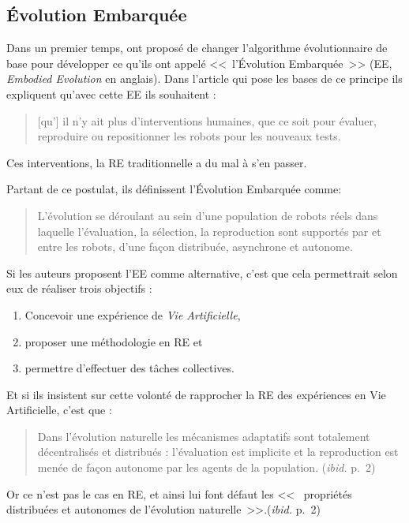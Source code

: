 \subsection{\'Evolution Embarquée}

Dans un premier temps, \cite{watson02embodiedevolutiondistributingevolutionaryalgorithmpopulationrobots} ont proposé de changer l'algorithme évolutionnaire de base pour développer ce qu'ils ont appelé <<~l'\'Evolution Embarquée~>> (EE, \emph{Embodied Evolution} en anglais). Dans l'article qui pose les bases de ce principe ils expliquent qu'avec cette EE ils souhaitent :
\begin{quote}
   [qu'] il n'y ait plus d'interventions humaines, que ce soit pour évaluer, reproduire ou repositionner les robots pour les nouveaux tests.\\
   \citep[p.~1]{watson02embodiedevolutiondistributingevolutionaryalgorithmpopulationrobots}
\end{quote}
Ces interventions, la RE traditionnelle a du mal à s'en passer.

Partant de ce postulat, ils définissent l'\'Evolution Embarquée comme:
\begin{quotation}
   L'évolution se déroulant au sein d'une population de robots réels dans laquelle l'évaluation, la sélection, la reproduction sont supportés par et entre les robots, d'une façon distribuée, asynchrone et autonome.\\
   \citep[p.~2]{watson02embodiedevolutiondistributingevolutionaryalgorithmpopulationrobots}
\end{quotation}

Si les auteurs proposent l'EE comme alternative, c'est que cela permettrait selon eux de réaliser trois objectifs :
\begin{enumerate}
\item Concevoir une expérience de \emph{Vie Artificielle},
\item proposer une méthodologie en RE et
\item permettre d'effectuer des tâches collectives.
\end{enumerate}

Et si ils insistent sur cette volonté de rapprocher la RE des expériences en Vie Artificielle, c'est que :
\begin{quote}
   Dans l'évolution naturelle les mécanismes adaptatifs sont totalement décentralisés et distribués : l'évaluation est implicite et la reproduction est menée de façon autonome par les agents de la population. (\emph{ibid.} p.~2)
\end{quote}
Or ce n'est pas le cas en RE, et ainsi lui font défaut les <<~ propriétés distribuées et autonomes de l'évolution naturelle~>>.(\emph{ibid.} p.~2)


